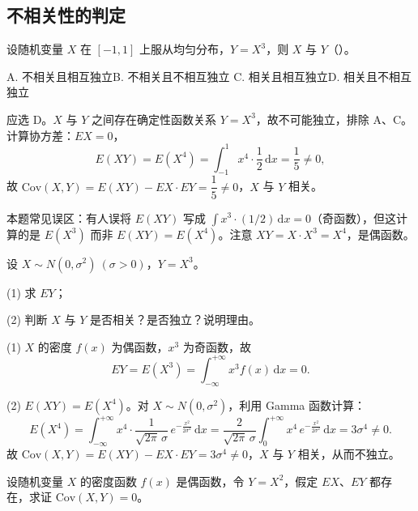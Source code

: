 ﻿\documentclass[lang=cn,11pt]{elegantbook}
\begin{document}
\subsection{不相关性的判定}

\begin{exercise}\label{exer:4-s4-x3}
设随机变量 \(X\) 在 \([-1,1]\) 上服从均匀分布，\(Y = X^3\)，则 \(X\) 与 \(Y\)（\quad）。\par
A. 不相关且相互独立\quad B. 不相关且不相互独立\quad
C. 相关且相互独立\quad D. 相关且不相互独立
\end{exercise}

\begin{solution}
应选 D。\(X\) 与 \(Y\) 之间存在确定性函数关系 \(Y = X^3\)，故不可能独立，排除 A、C。计算协方差：\(EX = 0\)，
\[
E(XY) = E(X^4) = \int_{-1}^{1} x^4 \cdot \frac{1}{2}\,\mathrm{d}x = \frac{1}{5} \neq 0,
\]
故 \(\mathrm{Cov}(X,Y) = E(XY) - EX \cdot EY = \dfrac{1}{5} \neq 0\)，\(X\) 与 \(Y\) 相关。

\begin{note}
本题常见误区：有人误将 \(E(XY)\) 写成 \(\int x^3 \cdot (1/2)\,\mathrm{d}x = 0\)（奇函数），但这计算的是 \(E(X^3)\) 而非 \(E(XY) = E(X^4)\)。注意 \(XY = X \cdot X^3 = X^4\)，是偶函数。
\end{note}
\end{solution}

\begin{exercise}\label{exer:4-s15-normal3}
设 \(X \sim N(0,\sigma^2)\ (\sigma > 0)\)，\(Y = X^3\)。\par
(1) 求 \(EY\)；\par
(2) 判断 \(X\) 与 \(Y\) 是否相关？是否独立？说明理由。
\end{exercise}

\begin{solution}
(1) \(X\) 的密度 \(f(x)\) 为偶函数，\(x^3\) 为奇函数，故
\[
EY = E(X^3) = \int_{-\infty}^{+\infty} x^3 f(x)\,\mathrm{d}x = 0.
\]

(2) \(E(XY) = E(X^4)\)。对 \(X \sim N(0,\sigma^2)\)，利用 Gamma 函数计算：
\[
E(X^4) = \int_{-\infty}^{+\infty} x^4 \cdot \frac{1}{\sqrt{2\pi}\,\sigma}\,e^{-\frac{x^2}{2\sigma^2}}\,\mathrm{d}x = \frac{2}{\sqrt{2\pi}\,\sigma}\int_0^{+\infty} x^4\,e^{-\frac{x^2}{2\sigma^2}}\,\mathrm{d}x = 3\sigma^4 \neq 0.
\]
故 \(\mathrm{Cov}(X,Y) = E(XY) - EX \cdot EY = 3\sigma^4 \neq 0\)，\(X\) 与 \(Y\) 相关，从而不独立。
\end{solution}

\begin{exercise}\label{exer:4-11-even}
设随机变量 \(X\) 的密度函数 \(f(x)\) 是偶函数，令 \(Y = X^2\)，假定 \(EX\)、\(EY\) 都存在，求证 \(\mathrm{Cov}(X,Y) = 0\)。
\end{exercise}
\end{document}
